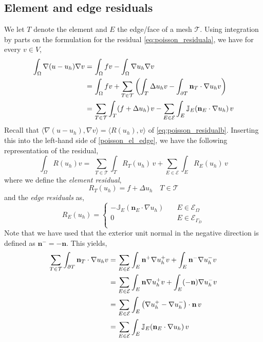 \subsection{Element and edge residuals}
We let $T$ denote the element and $E$ the edge/face of a mesh $\mathcal{T}$. Using integration by parts on the formulation for the residual \eqref{eq:poisson_residuala}, we have for every $v \in V$,
\begin{align} \label{poisson_el_edge}
\int_\Omega \nabla(u-u_h) \nabla v = & \, \int_\Omega fv - \int_\Omega \nabla u_h \nabla v \\ 
= & \,  \displaystyle\int_\Omega fv + \displaystyle\sum_{T \in \mathcal{T} } \left( \displaystyle\int_T \Delta u_h v - \displaystyle\int_{\partial T} \mathbf{n}_T \cdot \nabla u_h v\right) \notag\\ 
= & \, \displaystyle\sum_{T \in \mathcal{T}} \displaystyle\int_T (f + \Delta u_h) \,v - \displaystyle\sum_{E \in \mathcal{E}} \displaystyle\int_E \mathbb{J}_E(\mathbf{n}_E \cdot \nabla u_h) \, v  \notag
\end{align}
Recall that $\langle \nabla(u-u_h), \nabla v \rangle = \langle R(u_h), v \rangle$ of \eqref{eq:poisson_residualb}. Inserting this into the left-hand side of \eqref{poisson_el_edge}, we have the following representation of the residual,
\begin{equation} \label{eq:res_L2}
\int_\Omega R(u_h) v = \, \, \displaystyle\sum_{T \in \mathcal{T}} \displaystyle\int_T R_T(u_h)\, v  + \displaystyle\sum_{E \in  \mathcal{E}} \displaystyle\int_E R_E(u_h) \, v
\end{equation}
where we define the \textit{element residual}, 
\begin{equation} \label{eq:element_res}
R_T(u_h) = f + \Delta u_h \quad T \in \mathcal{T} 
\end{equation}
and the \textit{edge residuals} as,
\begin{equation} \label{eq:edge_res}
R_E(u_h) = \begin{cases} 
	- \mathbb{J}_E(\mathbf{n}_E \cdot \nabla u_h) & \quad  E \in \mathcal{E}_\Omega \\
     0 & \quad E \in \mathcal{E}_{\Gamma_D} \\
\end{cases}
\end{equation}
Note that we have used that the exterior unit normal in the negative direction is defined as $\mathbf{n}^- = -\mathbf{n}$. This yields, 
\begin{align}
\displaystyle\sum_{T \in \mathcal{T}} \displaystyle\int_{\partial T}\mathbf{n}_T \cdot \nabla u_h v = & \, \displaystyle\sum_{E \in \mathcal{E}} \displaystyle\int_E \mathbf{n}^+ \nabla u_h^+ v + \displaystyle\int_E \mathbf{n}^- \nabla u_h^- v \\
= & \, \displaystyle\sum_{E \in \mathcal{E}} \displaystyle\int_E \mathbf{n} \nabla u_h^+ v + \displaystyle\int_E (-\mathbf{n}) \nabla u_h^- v\notag\\
= & \, \displaystyle\sum_{E \in \mathcal{E}} \displaystyle\int_E \left(\nabla u_h^+ - \nabla u_h^- \right)\cdot \mathbf{n} \, v \notag\\
= & \, \displaystyle\sum_{E \in \mathcal{E}} \displaystyle\int_E \mathbb{J}_E(\mathbf{n}_E \cdot \nabla u_h) \, v \notag
\end{align} 
